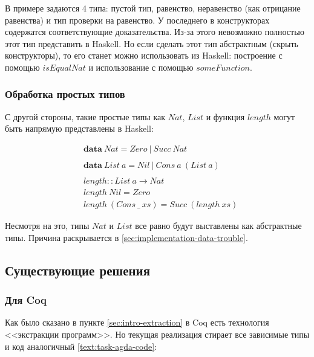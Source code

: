 В примере задаются 4 типа: пустой тип, равенство, неравенство
(как отрицание равенства) и тип проверки на равенство. У последнего
в конструкторах содержатся соответствующие доказательства. Из-за этого
невозможно полностью этот тип представить в Haskell. Но если сделать этот
тип абстрактным (скрыть конструкторы), то его станет можно использовать из
Haskell: построение с помощью \(isEqualNat\) и использование с помощью
\(someFunction\).

\subsubsection{Обработка простых типов}

С другой стороны, такие простые типы как \(Nat\), \(List\) и
функция \(length\) могут быть напрямую представлены в Haskell:

\begin{align*}
&\mathbf{data}\ Nat = Zero\ |\ Succ\ Nat\\
\\
&\mathbf{data}\ List\ a = Nil\ |\ Cons\ a\ (List\ a)\\
\\
&length :: List\ a \rightarrow Nat\\
&length\ Nil = Zero\\
&length\ (Cons\ \_\ xs) = Succ\ (length\ xs)
\end{align*}

Несмотря на это, типы \(Nat\) и \(List\) все равно будут выставлены
как абстрактные типы. Причина раскрывается в \ref{sec:implementation-data-trouble}.

\subsection{Существующие решения}

\subsubsection{Для Coq}

Как было сказано в пункте \ref{sec:intro-extraction} в Coq есть технология
<<экстракции программ>>. Но текущая реализация стирает все зависимые типы и
код аналогичный \ref{text:task-agda-code}:


